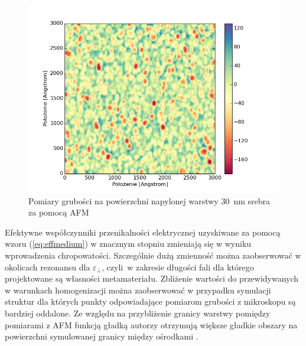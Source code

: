 \begin{figure}[bt]
		\includegraphics[width=\textwidth]{images/multilayer/ag30nm-afm-measure.png}
		\caption{Pomiary grubości na powierzchni napylonej warstwy $30$~nm srebra za pomocą AFM} 
		\label{fig:ag30nm-afmmeasure}
\end{figure}


Efektywne współczynniki przenikalności elektrycznej uzyskiwane za pomocą wzoru (\ref{eq:effmedium}) w znacznym stopniu zmieniają się w wyniku wprowadzenia chropowatości. Szczególnie dużą zmienność można zaobserwować w okolicach rezonansu dla $\varepsilon_{\perp}$, czyli~w zakresie długości fali dla którego projektowane są własności metamateriału. Zbliżenie wartości do przewidywanych w warunkach homogenizacji można zaobserwować w przypadku symulacji struktur dla których punkty odpowiadające pomiarom grubości z mikroskopu są bardziej oddalone. Ze względu na przybliżenie granicy warstwy pomiędzy pomiarami z AFM funkcją gładką autorzy otrzymują większe gładkie obszary na powierzchni symulowanej granicy między ośrodkami \cite{ludwig2012impact}. 


